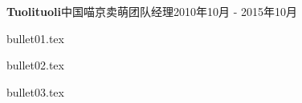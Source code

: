 \begin{rProject}{\bf Tuolituoli}{中国喵京}{卖萌团队经理}{2010年10月 - 2015年10月 }
    \item {bullet01.tex}
    \item {bullet02.tex}
    \item {bullet03.tex}
\end{rProject}
